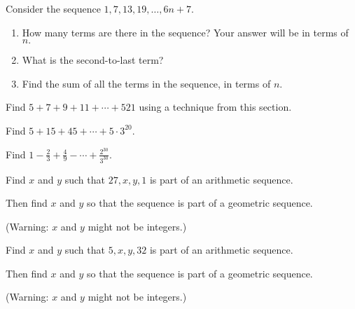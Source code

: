 \documentclass[11pt,]{book}
\theoremstyle{ptxplainnotitle}
\theoremstyle{ptxplaintitle}
\theoremstyle{ptxdefinitionnotitle}
\theoremstyle{ptxdefinitiontitle}
\theoremstyle{ptxdefinitionnotitle}
\theoremstyle{ptxdefinitiontitle}
\theoremstyle{ptxdefinitionnotitle}
\theoremstyle{ptxdefinitiontitle}
\theoremstyle{ptxdefinitiontitlenonumber}
\theoremstyle{ptxdefinitiontitlenonumber}
\numberwithin{equation}{chapter}
\begin{document}
\begin{divisionexercise}{4}\hypertarget{exercise-16}{}
\hypertarget{p-267}{}%
Consider the sequence \(1, 7, 13, 19, \ldots, 6n + 7\text{.}\) \leavevmode%
\begin{enumerate}[label=\alph*.]
\item\hypertarget{li-158}{}\hypertarget{p-268}{}%
How many terms are there in the sequence?  Your answer will be in terms of \(n\text{.}\)%
\item\hypertarget{li-159}{}\hypertarget{p-270}{}%
What is the second-to-last term?%
\item\hypertarget{li-160}{}\hypertarget{p-272}{}%
Find the sum of all the terms in the sequence, in terms of \(n\text{.}\)%
\end{enumerate}
%
\end{divisionexercise}%
\begin{divisionexercise}{5}\hypertarget{exercise-17}{}
\hypertarget{p-281}{}%
Find \(5 + 7 + 9 + 11+ \cdots + 521\) using a technique from this section.%
\end{divisionexercise}%
\begin{divisionexercise}{6}\hypertarget{exercise-18}{}
\hypertarget{p-287}{}%
Find \(5 + 15 + 45 + \cdots + 5\cdot 3^{20}\text{.}\)%
\end{divisionexercise}%
\begin{divisionexercise}{7}\hypertarget{exercise-19}{}
\hypertarget{p-293}{}%
Find \(1 - \frac{2}{3} + \frac{4}{9} - \cdots + \frac{2^{30}}{3^{30}}\text{.}\)%
\end{divisionexercise}%
\begin{divisionexercise}{8}\hypertarget{exercise-20}{}
\hypertarget{p-300}{}%
Find \(x\) and \(y\) such that \(27, x, y, 1\) is part of an arithmetic sequence.%
\par
\hypertarget{p-301}{}%
Then find \(x\) and \(y\) so that the sequence is part of a geometric sequence.%
\par
\hypertarget{p-302}{}%
(Warning: \(x\) and \(y\) might not be integers.)%
\end{divisionexercise}%
\begin{divisionexercise}{9}\hypertarget{exercise-21}{}
\hypertarget{p-308}{}%
Find \(x\) and \(y\) such that \(5, x, y, 32\) is part of an arithmetic sequence.%
\par
\hypertarget{p-309}{}%
Then find \(x\) and \(y\) so that the sequence is part of a geometric sequence.%
\par
\hypertarget{p-310}{}%
(Warning: \(x\) and \(y\) might not be integers.)%
\end{divisionexercise}%
\end{document}
